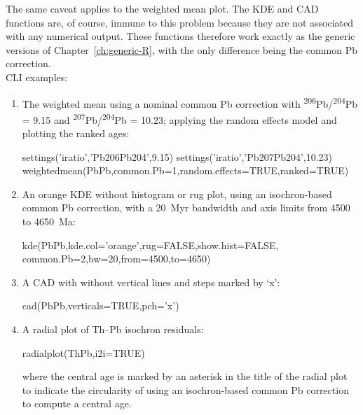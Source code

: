 \begin{refsection}
The same caveat applies to the weighted mean plot. The KDE and CAD
functions are, of course, immune to this problem because they are not
associated with any numerical output. These functions therefore work
exactly as the generic versions of Chapter~\ref{ch:generic-R}, with
the only difference being the common Pb correction.\\

\noindent CLI examples:

\begin{enumerate}

\item The weighted mean using a nominal common Pb correction with
  \textsuperscript{206}Pb/\textsuperscript{204}Pb = 9.15 and
  \textsuperscript{207}Pb/\textsuperscript{204}Pb = 10.23; applying
  the random effects model and plotting the ranked ages:
  
\begin{script}
settings('iratio','Pb206Pb204',9.15)
settings('iratio','Pb207Pb204',10.23)
weightedmean(PbPb,common.Pb=1,random.effects=TRUE,ranked=TRUE)
\end{script}

\item An orange KDE without histogram or rug plot, using an
  isochron-based common Pb correction, with a 20~Myr bandwidth and
  axis limits from 4500 to 4650~Ma:

\begin{script}
kde(PbPb,kde.col='orange',rug=FALSE,show.hist=FALSE,
    common.Pb=2,bw=20,from=4500,to=4650)
\end{script}

\item A CAD with without vertical lines and steps marked by `x':

\begin{console}
cad(PbPb,verticals=TRUE,pch='x')
\end{console}

\item A radial plot of Th--Pb isochron residuals:

\begin{console}
radialplot(ThPb,i2i=TRUE)
\end{console}

\noindent where the central age is marked by an asterisk in the title
of the radial plot to indicate the circularity of using an
isochron-based common Pb correction to compute a central age.

\end{enumerate}

\printbibliography[heading=subbibliography]

\end{refsection}
